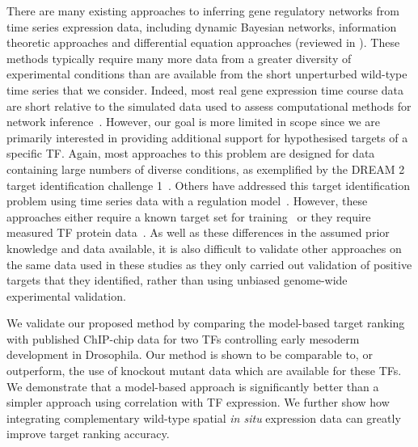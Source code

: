 \documentclass{pnastwo}
\begin{document}
\begin{article}
There are many existing approaches to inferring gene regulatory networks from
time series expression data, including dynamic Bayesian networks,
information theoretic approaches and differential equation approaches
(reviewed in \cite{Bansal2007a}). These methods typically require many
more data from a greater diversity of experimental conditions than are
available from the short unperturbed wild-type time series that we
consider. Indeed, most real gene expression time course data are short
relative to the simulated data used to assess computational methods
for network inference~\cite{Ernst2005}. However, our goal is more limited in scope since
we are primarily interested in providing additional support for hypothesised
targets of a specific TF. Again, most approaches to this problem are
designed for data containing large numbers of diverse conditions, as
exemplified by the DREAM 2 target identification
challenge 1~\cite{Stolovitzky2007}. Others
have addressed this target identification problem using time series
data with a regulation model~\cite{Barenco2006a,Gatta2008}. However,
these approaches either require a known target set for training~\cite{Barenco2006a} or
they require measured TF protein data~\cite{Gatta2008}. As well as
these differences in the assumed prior knowledge and data available,
it is also difficult to validate other approaches on the same data used in these
studies as they only carried out validation of positive targets
that they identified, rather than using unbiased genome-wide
experimental validation. 

We validate our proposed method by comparing the model-based target
ranking with published ChIP-chip data for two TFs controlling early
mesoderm development in Drosophila. Our method is shown to be comparable
to, or outperform, the use of knockout mutant data which are available
for these TFs. We demonstrate that a model-based approach is significantly
better than a simpler approach using correlation with TF
expression. We further show how integrating complementary wild-type spatial
{\em in situ} expression data can greatly improve target ranking accuracy. 


\end{article}
\end{document}

